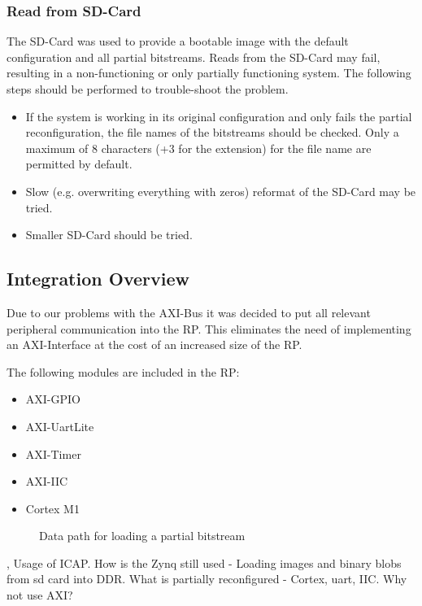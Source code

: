 \subsubsection{Read from SD-Card}
The SD-Card was used to provide a bootable image with the default configuration and all partial bitstreams.
Reads from the SD-Card may fail, resulting in a non-functioning or only partially functioning system.
The following steps should be performed to trouble-shoot the problem. 

\begin{itemize}
    \item If the system is working in its original configuration and only fails the partial reconfiguration, the file names of the bitstreams should be checked. Only a maximum of 8 characters (+3 for the extension) for the file name are permitted by default. 
    \item Slow (e.g. overwriting everything with zeros) reformat of the SD-Card may be tried.
    \item Smaller SD-Card should be tried.
\end{itemize}
\subsection{Integration Overview}
Due to our problems with the AXI-Bus it was decided to put all relevant peripheral communication into the \gls{RP}.
This eliminates the need of implementing an AXI-Interface at the cost of an increased size of the \gls{RP}.

The following modules are included in the \gls{RP}:
\begin{itemize}
    \item  AXI-GPIO
    \item  AXI-UartLite
    \item  AXI-Timer
    \item  AXI-IIC
    \item  Cortex M1
\end{itemize}

\begin{figure}[ht]
    \centering
{}
\caption{Data path for loading a partial bitstream}\label{fig:prIntegration}
\end{figure}
\cite{xilinx_vivado_2018-1}, \cite{xilinx_vivado_2018}
Usage of \gls{ICAP}.
How is the Zynq still used - Loading images and binary blobs from sd card into DDR.
What is partially reconfigured - Cortex, uart, IIC.
Why not use AXI?
